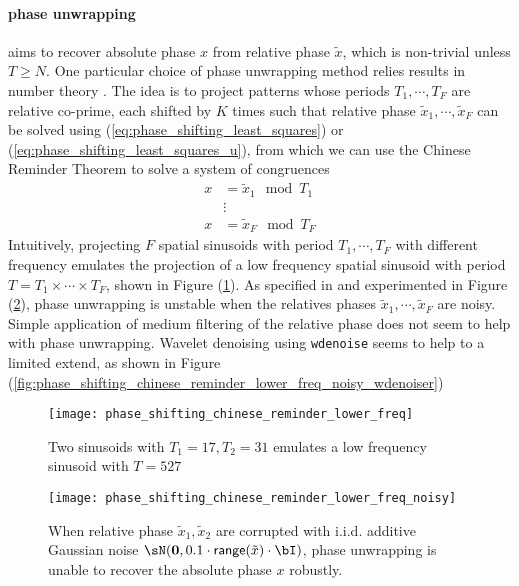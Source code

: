 \documentclass[../writeup.tex]{subfiles}
\begin{document}
\paragraph{phase unwrapping} aims to recover absolute phase $x$ from relative phase $\tilde{x}$, which is non-trivial unless $T\geq N$. One particular choice of phase unwrapping method relies results in number theory \cite{gushovAutomaticProcessingFringe1991}. The idea is to project patterns whose periods $T_1,\cdots,T_F$ are relative co-prime, each shifted by $K$ times such that relative phase $\tilde{x}_1,\cdots,\tilde{x}_F$ can be solved using (\ref{eq:phase_shifting_least_squares}) or (\ref{eq:phase_shifting_least_squares_u}), from which we can use the Chinese Reminder Theorem to solve a system of congruences
\begin{align}
    x
        &= \tilde{x}_1 \mod{T_1} 
        \nonumber \\
    &\vdots
        \nonumber \\
    x
        &= \tilde{x}_F \mod{T_F} 
    \label{eq:phase_shifting_congruence_system}
\end{align}
Intuitively, projecting $F$ spatial sinusoids with period $T_1,\cdots,T_F$ with different frequency emulates the projection of a low frequency spatial sinusoid with period $T = T_1\times \cdots\times T_F$, shown in Figure (\ref{fig:phase_shifting_emulate_low_freq}). As specified in \cite{guptaMicroPhaseShifting2012} and experimented in Figure (\ref{fig:phase_shifting_not_robust_to_noise}), phase unwrapping is unstable when the relatives phases $\tilde{x}_1,\cdots,\tilde{x}_F$ are noisy. Simple application of medium filtering of the relative phase does not seem to help with phase unwrapping. Wavelet denoising using \texttt{wdenoise} seems to help to a limited extend, as shown in Figure (\ref{fig:phase_shifting_chinese_reminder_lower_freq_noisy_wdenoiser})
\begin{figure}[h!]
    \begin{center}
        \texttt{[image: phase\_shifting\_chinese\_reminder\_lower\_freq]}
    \end{center}
    \caption{Two sinusoids with $T_1=17,T_2=31$ emulates a low frequency sinusoid with $T=527$}
    \label{fig:phase_shifting_emulate_low_freq}
\end{figure}
\begin{figure}[h!]
    \begin{center}
        \texttt{[image: phase\_shifting\_chinese\_reminder\_lower\_freq\_noisy]}
    \end{center}
    \caption{When relative phase $\tilde{x}_1,\tilde{x}_2$ are corrupted with i.i.d. additive Gaussian noise $\sN(\boldsymbol{0},0.1 \cdot \textsf{range}(\tilde{x}) \cdot \bI)$, phase unwrapping is unable to recover the absolute phase $x$ robustly.}
    \label{fig:phase_shifting_not_robust_to_noise}
\end{figure}
\end{document}

